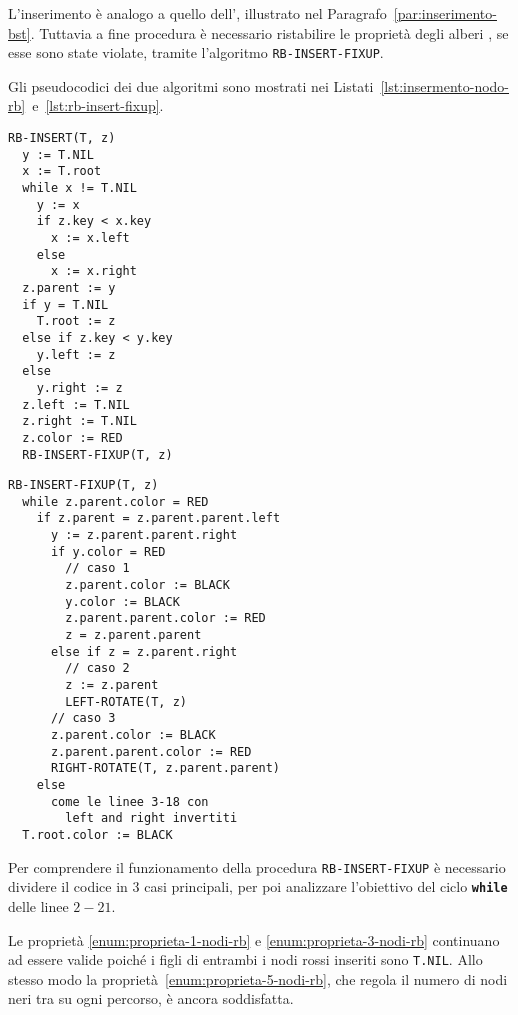 \documentclass[italian, 10pt]{article}
\begin{document}
L'inserimento è analogo a quello dell'\BST, illustrato nel Paragrafo~\ref{par:inserimento-bst}.
Tuttavia a fine procedura è necessario ristabilire le proprietà degli alberi \RB, se esse sono state violate, tramite l'algoritmo \texttt{RB-INSERT-FIXUP}.

\bigskip
Gli pseudocodici dei due algoritmi sono mostrati nei Listati~\ref{lst:insermento-nodo-rb}~e~\ref{lst:rb-insert-fixup}.

\begin{minipage}[t]{0.445\textwidth}
  \begin{lstlisting}[style=pseudocode, caption={Inserimento in un RB}, label={lst:insermento-nodo-rb}]
RB-INSERT(T, z)
  y := T.NIL
  x := T.root
  while x != T.NIL
    y := x
    if z.key < x.key
      x := x.left
    else
      x := x.right
  z.parent := y
  if y = T.NIL
    T.root := z
  else if z.key < y.key
    y.left := z
  else
    y.right := z
  z.left := T.NIL
  z.right := T.NIL
  z.color := RED
  RB-INSERT-FIXUP(T, z)
\end{lstlisting}
\end{minipage}
\begin{minipage}[t]{0.55\textwidth}
  \begin{lstlisting}[style=pseudocode, caption={Fixup dopo inserimento}, label={lst:rb-insert-fixup}]
RB-INSERT-FIXUP(T, z)
  while z.parent.color = RED
    if z.parent = z.parent.parent.left
      y := z.parent.parent.right
      if y.color = RED
        // caso 1
        z.parent.color := BLACK
        y.color := BLACK
        z.parent.parent.color := RED
        z = z.parent.parent
      else if z = z.parent.right
        // caso 2
        z := z.parent
        LEFT-ROTATE(T, z)
      // caso 3
      z.parent.color := BLACK
      z.parent.parent.color := RED
      RIGHT-ROTATE(T, z.parent.parent)
    else
      come le linee 3-18 con
        left and right invertiti
  T.root.color := BLACK
  \end{lstlisting}
\end{minipage}

Per comprendere il funzionamento della procedura \texttt{RB-INSERT-FIXUP} è necessario dividere il codice in \(3\) casi principali, per poi analizzare l'obiettivo del ciclo \textbf{\texttt{while}} delle linee \(2-21\).

Le proprietà \ref{enum:proprieta-1-nodi-rb} e \ref{enum:proprieta-3-nodi-rb} continuano ad essere valide poiché i figli di entrambi i nodi rossi inseriti sono \texttt{T.NIL}.
Allo stesso modo la proprietà~\ref{enum:proprieta-5-nodi-rb}, che regola il numero di nodi neri tra su ogni percorso, è ancora soddisfatta.
\end{document}
